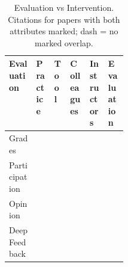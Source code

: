 \begin{table}[!htbp]
\centering
\small
\setlength{\tabcolsep}{4pt}
\renewcommand{\arraystretch}{1.3}
\caption{Evaluation vs Intervention. Citations for papers with both attributes marked; dash = no marked overlap.}
\begin{tabularx}{\linewidth}{|>{\raggedright\arraybackslash}p{0.23\linewidth}|>{\centering\arraybackslash}X|>{\centering\arraybackslash}X|>{\centering\arraybackslash}X|>{\centering\arraybackslash}X|>{\centering\arraybackslash}X|}
\hline
\textbf{Evaluation} & \textbf{\hspace{0pt}Practice} & \textbf{\hspace{0pt}Tool} & \textbf{\hspace{0pt}Colleagues} & \textbf{\hspace{0pt}Instructors} & \textbf{\hspace{0pt}Evaluation} \\ \hline
Grades & \cite{anon2020title10} \cite{anon2020title12} \cite{anon2020title8} & \cite{anon2020title12} \cite{anon2020title8} & \cite{anon2020title10} \cite{anon2020title32} \cite{anon2020title42} \cite{anon2020title48} & \cite{anon2020title32} \cite{anon2020title42} & \cite{anon2020title19} \cite{anon2020title35} \cite{anon2020title48} \cite{anon2020title8} \\ \hline
Participation & \cite{anon2020title12} \cite{anon2020title22} \cite{anon2020title45} & \cite{anon2020title12} \cite{anon2020title45} & \cite{anon2020title22} \cite{anon2020title7} & \cite{anon2020title15} & \cite{anon2020title7} \\ \hline
Opinion & \cite{anon2020title37} \cite{anon2020title45} \cite{anon2020title8} & \cite{anon2020title37} \cite{anon2020title45} \cite{anon2020title8} & \cite{anon2020title25} \cite{anon2020title28} \cite{anon2020title42} & \cite{anon2020title25} \cite{anon2020title42} & \cite{anon2020title17} \cite{anon2020title3} \cite{anon2020title8} \\ \hline
Deep Feedback & \cite{anon2020title45} & \cite{anon2020title45} & \cite{anon2020title25} \cite{anon2020title28} & \cite{anon2020title25} & \cite{anon2020title17} \\ \hline
\end{tabularx}
\end{table}
